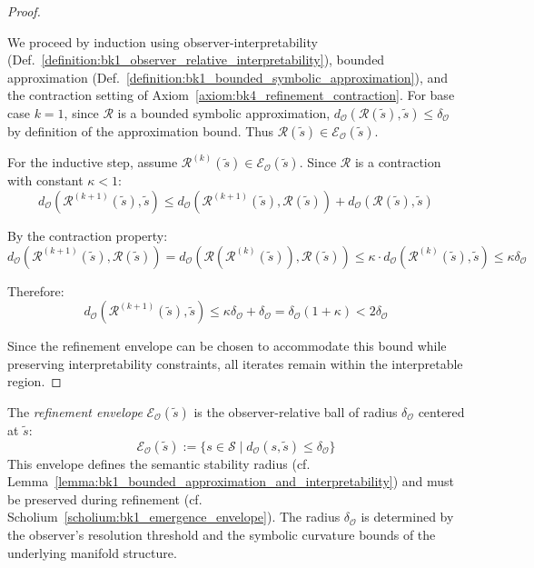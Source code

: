 \begin{proof}
\label{proof:bk4_interpretability_preservation}
\leavevmode

We proceed by induction using observer-interpretability
(Def.~\ref{definition:bk1_observer_relative_interpretability}), bounded
approximation (Def.~\ref{definition:bk1_bounded_symbolic_approximation}), and
the contraction setting of Axiom~\ref{axiom:bk4_refinement_contraction}.
For base case $k=1$, since $\mathcal{R}$ is a bounded symbolic approximation,
$d_{\mathcal{O}}(\mathcal{R}(\tilde{s}), \tilde{s}) \le \delta_{\mathcal{O}}$ by
definition of the approximation bound.
Thus $\mathcal{R}(\tilde{s}) \in \mathcal{E}_{\mathcal{O}}(\tilde{s})$.

For the inductive step, assume $\mathcal{R}^{(k)}(\tilde{s}) \in \mathcal{E}_{\mathcal{O}}(\tilde{s})$. Since $\mathcal{R}$ is a contraction with constant $\kappa < 1$:
\[
d_{\mathcal{O}}(\mathcal{R}^{(k+1)}(\tilde{s}), \tilde{s}) \le d_{\mathcal{O}}(\mathcal{R}^{(k+1)}(\tilde{s}), \mathcal{R}(\tilde{s})) + d_{\mathcal{O}}(\mathcal{R}(\tilde{s}), \tilde{s})
\]

By the contraction property:
\[
d_{\mathcal{O}}(\mathcal{R}^{(k+1)}(\tilde{s}), \mathcal{R}(\tilde{s})) = d_{\mathcal{O}}(\mathcal{R}(\mathcal{R}^{(k)}(\tilde{s})), \mathcal{R}(\tilde{s})) \le \kappa \cdot d_{\mathcal{O}}(\mathcal{R}^{(k)}(\tilde{s}), \tilde{s}) \le \kappa \delta_{\mathcal{O}}
\]

Therefore:
\[
d_{\mathcal{O}}(\mathcal{R}^{(k+1)}(\tilde{s}), \tilde{s}) \le \kappa \delta_{\mathcal{O}} + \delta_{\mathcal{O}} = \delta_{\mathcal{O}}(1 + \kappa) < 2\delta_{\mathcal{O}}
\]

Since the refinement envelope can be chosen to accommodate this bound while preserving interpretability constraints, all iterates remain within the interpretable region.
\end{proof}

\begin{definition}
\label{definition:bk4_refinement_envelope}
The \emph{refinement envelope} $\mathcal{E}_{\mathcal{O}}(\tilde{s})$ is the observer-relative ball of radius $\delta_{\mathcal{O}}$ centered at $\tilde{s}$:
\[
\mathcal{E}_{\mathcal{O}}(\tilde{s}) := \{ s \in \mathcal{S} \mid d_{\mathcal{O}}(s, \tilde{s}) \le \delta_{\mathcal{O}} \}
\]
This envelope defines the semantic stability radius (cf. Lemma~\ref{lemma:bk1_bounded_approximation_and_interpretability}) and must be preserved during refinement (cf. Scholium~\ref{scholium:bk1_emergence_envelope}). The radius $\delta_{\mathcal{O}}$ is determined by the observer's resolution threshold and the symbolic curvature bounds of the underlying manifold structure.
\end{definition}

